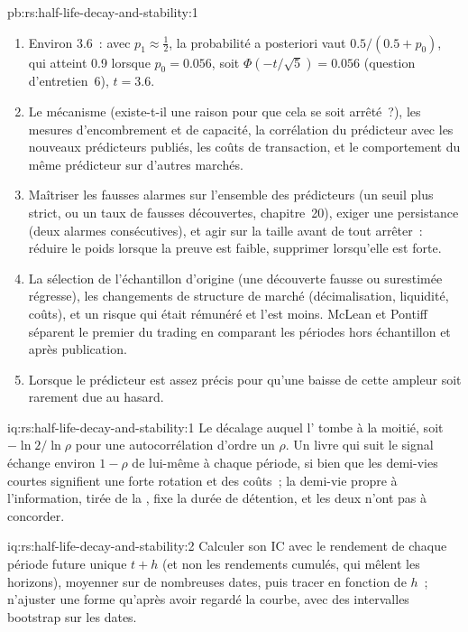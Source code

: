 \begin{solution}{pb:rs:half-life-decay-and-stability:1}
\begin{enumerate}
\item Environ 3.6~: avec $p_1 \approx \frac12$, la probabilité a posteriori vaut $0.5/(0.5 + p_0)$, qui atteint 0.9 lorsque $p_0 = 0.056$, soit
$\Phi(-t/\sqrt5) = 0.056$ (question d'entretien~6), $t = 3.6$.
\item Le mécanisme (existe-t-il une raison pour que cela se soit arrêté~?), les mesures d'encombrement et de capacité, la corrélation du prédicteur avec les nouveaux
prédicteurs publiés, les coûts de transaction, et le comportement du même prédicteur sur d'autres marchés.
\item Maîtriser les fausses alarmes sur l'ensemble des prédicteurs (un seuil plus strict, ou un taux de fausses découvertes, chapitre~20), exiger une persistance (deux
alarmes consécutives), et agir sur la taille avant de tout arrêter~: réduire le poids lorsque la preuve est faible, supprimer lorsqu'elle est forte.
\item La sélection de l'échantillon d'origine (une découverte fausse ou surestimée régresse), les changements de structure de marché (décimalisation, liquidité,
coûts), et un risque qui était rémunéré et l'est moins. McLean et Pontiff séparent le premier du trading en comparant les périodes hors échantillon et
après publication.
\item Lorsque le prédicteur est assez précis pour qu'une baisse de cette ampleur soit rarement due au hasard.
\end{enumerate}
\end{solution}

\begin{solution}{iq:rs:half-life-decay-and-stability:1}
Le décalage auquel l' tombe à la moitié, soit $-\ln 2/\ln\rho$ pour une autocorrélation d'ordre un $\rho$. Un livre qui suit le
signal échange environ $1 - \rho$ de lui-même à chaque période, si bien que les demi-vies courtes signifient une forte rotation et des coûts~; la demi-vie
propre à l'information, tirée de la , fixe la durée de détention, et les deux n'ont pas à concorder.
\end{solution}

\begin{solution}{iq:rs:half-life-decay-and-stability:2}
Calculer son IC avec le rendement de chaque période future unique $t + h$ (et non les rendements cumulés, qui mêlent les horizons), moyenner sur de nombreuses dates, puis tracer
en fonction de $h$~; n'ajuster une forme qu'après avoir regardé la courbe, avec des intervalles bootstrap sur les dates.
\end{solution}

